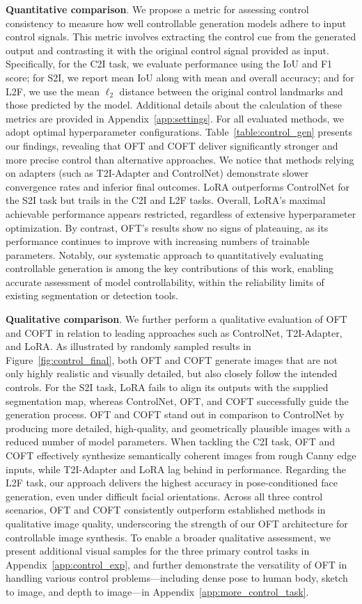 \textbf{Quantitative comparison}. We propose a metric for assessing control consistency to measure how well controllable generation models adhere to input control signals. This metric involves extracting the control cue from the generated output and contrasting it with the original control signal provided as input. Specifically, for the C2I task, we evaluate performance using the IoU and F1 score; for S2I, we report mean IoU along with mean and overall accuracy; and for L2F, we use the mean $\ell_2$ distance between the original control landmarks and those predicted by the model. Additional details about the calculation of these metrics are provided in Appendix~\ref{app:settings}. For all evaluated methods, we adopt optimal hyperparameter configurations. Table~\ref{table:control_gen} presents our findings, revealing that OFT and COFT deliver significantly stronger and more precise control than alternative approaches. We notice that methods relying on adapters (such as T2I-Adapter and ControlNet) demonstrate slower convergence rates and inferior final outcomes. LoRA outperforms ControlNet for the S2I task but trails in the C2I and L2F tasks. Overall, LoRA’s maximal achievable performance appears restricted, regardless of extensive hyperparameter optimization. By contrast, OFT’s results show no signs of plateauing, as its performance continues to improve with increasing numbers of trainable parameters. Notably, our systematic approach to quantitatively evaluating controllable generation is among the key contributions of this work, enabling accurate assessment of model controllability, within the reliability limits of existing segmentation or detection tools.

\textbf{Qualitative comparison}. We further perform a qualitative evaluation of OFT and COFT in relation to leading approaches such as ControlNet, T2I-Adapter, and LoRA. As illustrated by randomly sampled results in Figure~\ref{fig:control_final}, both OFT and COFT generate images that are not only highly realistic and visually detailed, but also closely follow the intended controls. For the S2I task, LoRA fails to align its outputs with the supplied segmentation map, whereas ControlNet, OFT, and COFT successfully guide the generation process. OFT and COFT stand out in comparison to ControlNet by producing more detailed, high-quality, and geometrically plausible images with a reduced number of model parameters. When tackling the C2I task, OFT and COFT effectively synthesize semantically coherent images from rough Canny edge inputs, while T2I-Adapter and LoRA lag behind in performance. Regarding the L2F task, our approach delivers the highest accuracy in pose-conditioned face generation, even under difficult facial orientations. Across all three control scenarios, OFT and COFT consistently outperform established methods in qualitative image quality, underscoring the strength of our OFT architecture for controllable image synthesis. To enable a broader qualitative assessment, we present additional visual samples for the three primary control tasks in Appendix~\ref{app:control_exp}, and further demonstrate the versatility of OFT in handling various control problems—including dense pose to human body, sketch to image, and depth to image—in Appendix~\ref{app:more_control_task}.

